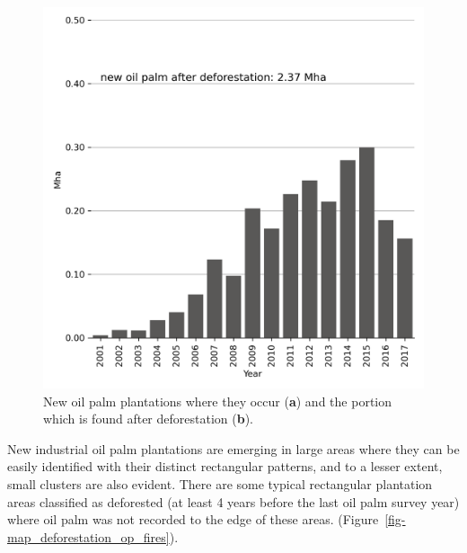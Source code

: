 \documentclass[
  letterpaper,
  DIV=11,
  numbers=noendperiod]{scrreprt}
\begin{document}
\begin{figure}
\begin{minipage}[t]{0.49\linewidth}
{{\includegraphics{text/../code/results/final_plots/new_oil_palm_after_deforestation.png}

}

}

\end{minipage}%

\caption{\label{fig-barchart_op}New oil palm plantations where they
occur (\textbf{a}) and the portion which is found after deforestation
(\textbf{b}).}

\end{figure}

New industrial oil palm plantations are emerging in large areas where
they can be easily identified with their distinct rectangular patterns,
and to a lesser extent, small clusters are also evident. There are some
typical rectangular plantation areas classified as deforested (at least
4 years before the last oil palm survey year) where oil palm was not
recorded to the edge of these areas.
(Figure~\ref{fig-map_deforestation_op_fires}).
\end{document}
